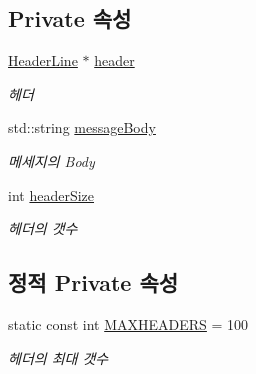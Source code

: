 \subsection*{Private 속성}
\begin{DoxyCompactItemize}
\item 
\mbox{\label{classhttp_1_1_message_a4a238c04c3a7b2e49c640eb0784f3798}} 
\hyperlink{structhttp_1_1_header_line}{Header\+Line} $\ast$ \hyperlink{classhttp_1_1_message_a4a238c04c3a7b2e49c640eb0784f3798}{header}
\begin{DoxyCompactList}\small\item\em 헤더 \end{DoxyCompactList}\item 
\mbox{\label{classhttp_1_1_message_afcad3d09b8389e5e7c0d6eb433b69be4}} 
std\+::string \hyperlink{classhttp_1_1_message_afcad3d09b8389e5e7c0d6eb433b69be4}{message\+Body}
\begin{DoxyCompactList}\small\item\em 메세지의 Body \end{DoxyCompactList}\item 
\mbox{\label{classhttp_1_1_message_abf4fab93257b3d37930ed20627f1c061}} 
int \hyperlink{classhttp_1_1_message_abf4fab93257b3d37930ed20627f1c061}{header\+Size}
\begin{DoxyCompactList}\small\item\em 헤더의 갯수 \end{DoxyCompactList}\end{DoxyCompactItemize}
\subsection*{정적 Private 속성}
\begin{DoxyCompactItemize}
\item 
\mbox{\label{classhttp_1_1_message_abc49c33614b0bb3cab83f764cad9d1c1}} 
static const int \hyperlink{classhttp_1_1_message_abc49c33614b0bb3cab83f764cad9d1c1}{M\+A\+X\+H\+E\+A\+D\+E\+RS} = 100
\begin{DoxyCompactList}\small\item\em 헤더의 최대 갯수 \end{DoxyCompactList}\end{DoxyCompactItemize}


